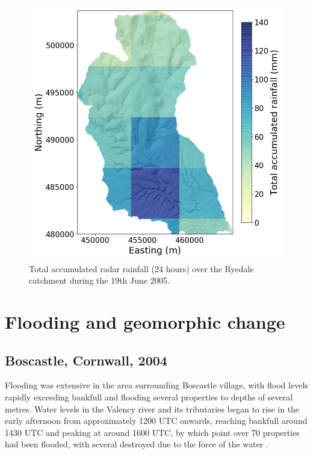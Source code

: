 
\begin{figure}[htb]
\includegraphics[width=13cm]{chp_events_figures_scripts/figure_ryedale_total_rainfall.png}
\caption{Total accumulated radar rainfall (24 hours) over the Ryedale catchment during the 19th June 2005.}
\label{fig_ryedale_rain_totals}
\end{figure}

\section{Flooding and geomorphic change}

\subsection{Boscastle, Cornwall, 2004}
Flooding was extensive in the area surrounding Boscastle village, with flood levels rapidly exceeding bankfull and flooding several properties to depths of several metres. Water levels in the Valency river and its tributaries began to rise in the early afternoon from approximately 1200 UTC onwards, reaching bankfull around 1430 UTC and peaking at around 1600 UTC, by which point over 70 properties had been flooded, with several destroyed due to the force of the water \citep{wallingford2005flooding}.

